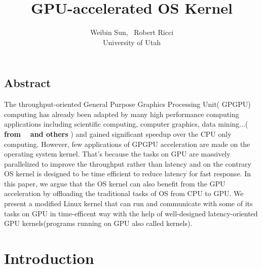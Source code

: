 \documentclass[letterpaper,twocolumn,10pt]{article}
\begin{document}
\date{}

\title{\Large \bf GPU-accelerated OS Kernel}


\author{
{\rm Weibin Sun, \  Robert Ricci}\\
University of Utah
} %

\maketitle



\subsection*{Abstract}
The throughput-oriented General Purpose Graphics Processing Unit(
GPGPU) computing has already been adapted by many high performance
computing applications including scientific computing, computer
graphics, data mining...( { \color{red} \textbf{from 
~\cite{Owens:2007:ASO, Garland:2010:UTA} and others} }) and gained
significant speedup over the CPU only computing. However, few
applications of GPGPU acceleration are made on the operating system
kernel. That's because the tasks on GPU are massively parallelized to
improve the throughput rather than latency and on the contrary OS
kernel is designed to be time efficient to reduce latency for fast
response. In this paper, we argue that the OS kernel can also benefit
from the GPU acceleration by offloading the traditional tasks of OS
from CPU to GPU. We present a modified Linux kernel that can run and
communicate with some of its tasks on GPU in time-efficent way with
the help of well-designed latency-oriented GPU kernels(programs
running on GPU also called kernels).

\section{Introduction}
\end{document}
